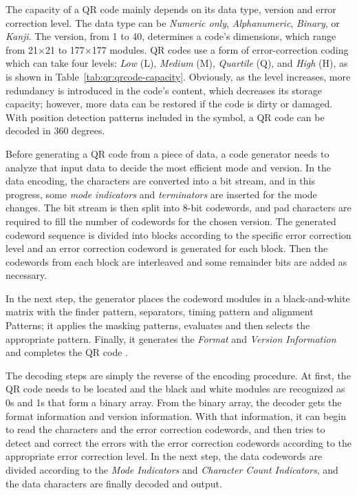 The capacity of a QR code mainly depends on its data type, version and error correction level. The data type can be \emph{Numeric only},  \emph{Alphanumeric},  \emph{Binary}, or \emph{Kanji}. The version, from 1 to 40, determines a code's dimensions, which range from 21$\times$21 to 177$\times$177 modules. QR codes use a form of error-correction coding which can take four levels: \emph{Low} (L),  \emph{Medium} (M),  \emph{Quartile} (Q), and  \emph{High} (H), as is shown in Table~\ref{tab:qr:qrcode-capacity}. Obviously, as the level increases, more redundancy is introduced in the code's content, which decreases its storage capacity; however, more data can be restored if the code is dirty or damaged. With position detection patterns included in the symbol, a QR code can be decoded in 360 degrees.

Before generating a QR code from a piece of data, a code generator needs to analyze that input data to decide the most efficient mode and version. In the data encoding, the characters are converted into a bit stream, and in this progress, some \emph{mode indicators} and \emph{terminators} are inserted for the mode changes. The bit stream is then split into 8-bit codewords, and pad characters are required to fill the number of codewords for the chosen version. The generated codeword sequence is divided into blocks according to the specific error correction level and an error correction codeword is generated for each block. Then the codewords from each block are interleaved and some remainder bits are added as necessary.

In the next step, the generator places the codeword modules in a black-and-white matrix with the finder pattern, separators, timing pattern and alignment Patterns; it applies the masking patterns, evaluates and then selects the appropriate pattern. Finally, it generates the \emph{Format} and \emph{Version Information} and completes the QR code \cite{iso18004}.

The decoding steps are simply the reverse of the encoding procedure. At first, the QR code needs to be located and the black and white modules are recognized as 0s and 1s that form a binary array. From the binary array, the decoder gets the format information and version information. With that information, it can begin to read the characters and the error correction codewords, and then tries to detect and correct the errors with the error correction codewords according to the appropriate error correction level. In the next step, the data codewords are divided according to the \emph{Mode Indicators} and \emph{Character Count Indicators}, and the data characters are finally decoded and output.

